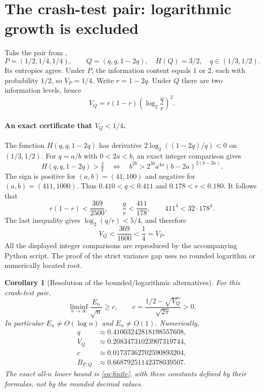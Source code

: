 \documentclass[11pt,a4paper]{article}
\newtheorem{corollary}[theorem]{Corollary}
\begin{document}
\section{The crash-test pair: logarithmic growth is excluded}
Take the pair from \cite{mikulik},
\[
P=(1/2,1/4,1/4),\qquad Q=(q,q,1-2q),
\quad H(Q)=3/2,\quad q\in(1/3,1/2).
\]
Its entropies agree. Under $P$, the information content equals $1$ or $2$,
each with probability $1/2$, so $V_P=1/4$.
Write $r=1-2q$. Under $Q$ there are two information levels, hence
\begin{equation}\label{eq:vq}
V_Q=r(1-r)\left(\log_2\frac qr\right)^2.
\end{equation}

\paragraph{An exact certificate that $V_Q<1/4$.}
The function $H(q,q,1-2q)$ has derivative
$2\log_2((1-2q)/q)<0$ on $(1/3,1/2)$.
For $q=a/b$ with $0<2a<b$, an exact integer comparison gives
\[
H(q,q,1-2q)>\tfrac32
\quad\Longleftrightarrow\quad
b^{2b}>2^{3b}a^{4a}(b-2a)^{2(b-2a)}.
\]
The sign is positive for $(a,b)=(41,100)$ and negative for
$(a,b)=(411,1000)$. Thus $0.410<q<0.411$ and $0.178<r<0.180$.
It follows that
\[
r(1-r)<\frac{369}{2500},\qquad
\frac qr<\frac{411}{178},\qquad
411^4<32\cdot178^4.
\]
The last inequality gives $\log_2(q/r)<5/4$, and therefore
\[
\boxed{V_Q<\frac{369}{1600}<\frac14=V_P.}
\]
All the displayed integer comparisons are reproduced by the accompanying
Python script. The proof of the strict variance gap uses no rounded
logarithm or numerically located root.

\begin{corollary}[Resolution of the bounded/logarithmic alternatives]
For this crash-test pair,
\[
\liminf_{n\to\infty}\frac{E_n}{\sqrt n}\ge c,
\qquad
c=\frac{1/2-\sqrt{V_Q}}{\sqrt{2\pi}}>0.
\]
In particular $E_n\ne O(\log n)$ and $E_n\ne O(1)$.
Numerically,
\begin{align*}
q&\approx0.41003242818198557608,\\
V_Q&\approx0.20834731023907319744,\\
c&\approx0.01737362702590893204,\\
B_{P,Q}&\approx0.66879251142378039507.
\end{align*}
The exact all-$n$ lower bound is \eqref{eq:finite}, with these constants
defined by their formulas, not by the rounded decimal values.
\end{corollary}
\end{document}
